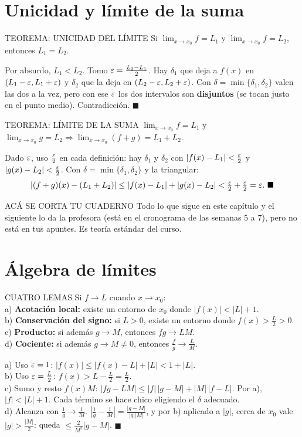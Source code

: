 \section{Unicidad y límite de la suma}
\apuntes
\begin{sello}{TEOREMA: UNICIDAD DEL LÍMITE}
Si $\lim_{x\to x_0}f=L_1$ y $\lim_{x\to x_0}f=L_2$, entonces $L_1=L_2$.
\end{sello}
\begin{demo}
Por absurdo, $L_1<L_2$. Tomo $\varepsilon=\frac{L_2-L_1}2$. Hay $\delta_1$ que deja a $f(x)$ en $(L_1-\varepsilon,L_1+\varepsilon)$ y $\delta_2$ que la deja en $(L_2-\varepsilon,L_2+\varepsilon)$. Con $\delta=\min\{\delta_1,\delta_2\}$ valen las dos a la vez, pero con ese $\varepsilon$ los dos intervalos son \textbf{disjuntos} (se tocan justo en el punto medio). Contradicción. $\blacksquare$
\end{demo}
\apuntes
\begin{sello}{TEOREMA: LÍMITE DE LA SUMA}
$\lim_{x\to x_0}f=L_1$ y $\lim_{x\to x_0}g=L_2\Rightarrow\lim_{x\to x_0}(f+g)=L_1+L_2$.
\end{sello}
\begin{demo}
Dado $\varepsilon$, uso $\frac{\varepsilon}2$ en cada definición: hay $\delta_1$ y $\delta_2$ con $|f(x)-L_1|<\frac{\varepsilon}2$ y $|g(x)-L_2|<\frac{\varepsilon}2$. Con $\delta=\min\{\delta_1,\delta_2\}$ y la triangular:
\[|(f+g)(x)-(L_1+L_2)|\le|f(x)-L_1|+|g(x)-L_2|<\tfrac\eps2+\tfrac\eps2=\eps.\ \blacksquare\]
\end{demo}
\begin{trampa}{ACÁ SE CORTA TU CUADERNO}
Todo lo que sigue en este capítulo y el siguiente lo da la profesora (está en el cronograma de las semanas 5 a 7), pero no está en tus apuntes. Es teoría estándar del curso.
\end{trampa}

\section{Álgebra de límites}
\agregado
\begin{sello}{CUATRO LEMAS}
Si $f\to L$ cuando $x\to x_0$:\\[2pt]
a) \textbf{Acotación local:} existe un entorno de $x_0$ donde $|f(x)|<|L|+1$.\\
b) \textbf{Conservación del signo:} si $L>0$, existe un entorno donde $f(x)>\frac L2>0$.\\
c) \textbf{Producto:} si además $g\to M$, entonces $fg\to LM$.\\
d) \textbf{Cociente:} si además $g\to M\neq0$, entonces $\frac fg\to\frac LM$.
\end{sello}
\begin{demo}
a) Uso $\varepsilon=1$: $|f(x)|\le|f(x)-L|+|L|<1+|L|$.\\[2pt]
b) Uso $\varepsilon=\frac L2$: $f(x)>L-\frac L2=\frac L2$.\\[2pt]
c) Sumo y resto $f(x)M$: $|fg-LM|\le|f|\,|g-M|+|M|\,|f-L|$. Por a), $|f|<|L|+1$. Cada término se hace chico eligiendo el $\delta$ adecuado.\\[2pt]
d) Alcanza con $\frac1g\to\frac1M$. $\left|\frac1g-\frac1M\right|=\frac{|g-M|}{|g||M|}$, y por b) aplicado a $|g|$, cerca de $x_0$ vale $|g|>\frac{|M|}2$: queda $\le\frac2{M^2}|g-M|$. $\blacksquare$
\end{demo}

